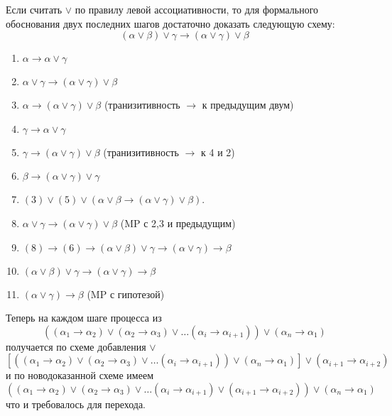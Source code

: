 \documentclass[10pt]{article}
\begin{document}
Если считать $\lor$ по правилу левой ассоциативности, то для формального обоснования двух последних шагов достаточно доказать следующую схему: 
\[ (\alpha \lor \beta) \lor \gamma \to (\alpha \lor \gamma) \lor \beta \]
\begin{enumerate}
    \item $\alpha \to \alpha \lor \gamma$ 
    \item $\alpha \lor \gamma \to (\alpha \lor \gamma) \lor \beta$
    \item $\alpha \to (\alpha \lor \gamma) \lor \beta$ (транизитивность $\to$ к предыдущим двум)
    \item $\gamma \to \alpha \lor \gamma$
    \item $\gamma \to (\alpha \lor \gamma) \lor \beta$ (транизитивность $\to$ к 4 и 2)
    \item $\beta \to (\alpha \lor \gamma) \lor \gamma$ 
    \item $(3) \lor (5) \lor (\alpha \lor \beta \to (\alpha \lor \gamma) \lor \beta)$.
    \item $\alpha \lor \gamma \to (\alpha \lor \gamma) \lor \beta$ (MP с 2,3 и предыдущим)
    \item $(8) \to (6) \to (\alpha \lor \beta) \lor \gamma \to (\alpha \lor \gamma) \to \beta$
    \item $(\alpha \lor \beta) \lor \gamma \to (\alpha \lor \gamma) \to \beta$
    \item $(\alpha \lor \gamma) \to \beta$ (MP с гипотезой)
\end{enumerate}
Теперь на каждом шаге процесса из 
\[ ((\alpha_1 \to \alpha_2) \lor (\alpha_2 \to \alpha_3) \lor \ldots (\alpha_i \to \alpha_{i+1})) \lor (\alpha_n \to \alpha_1)  \]
получается по схеме добавления $\lor$ 
\[ [((\alpha_1 \to \alpha_2) \lor (\alpha_2 \to \alpha_3) \lor \ldots (\alpha_i \to \alpha_{i+1})) \lor (\alpha_n \to \alpha_1)] \lor (\alpha_{i+1} \to \alpha_{i+2})\] 
и по новодоказанной схеме имеем 
\[ ((\alpha_1 \to \alpha_2) \lor (\alpha_2 \to \alpha_3) \lor \ldots (\alpha_i \to \alpha_{i+1}) \lor (\alpha_{i+1} \to \alpha_{i+2})) \lor (\alpha_n \to \alpha_1) \]
что и требовалось для перехода.
\end{document}
